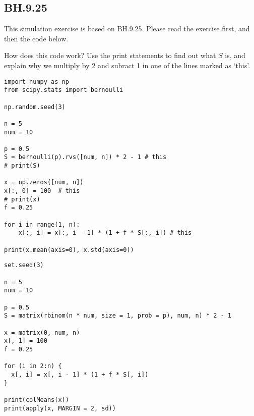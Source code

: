 

\subsection{BH.9.25}

This simulation exercise is based on BH.9.25.  Please read the exercise first, and then the code below.

\begin{exercise}
How does this code work? Use the print statements to find out what $S$ is, and explain why we multiply by 2 and subract 1 in one of the lines marked as `this'.

\begin{verbatim}
import numpy as np
from scipy.stats import bernoulli

np.random.seed(3)

n = 5
num = 10

p = 0.5
S = bernoulli(p).rvs([num, n]) * 2 - 1 # this
# print(S)

x = np.zeros([num, n])
x[:, 0] = 100  # this
# print(x)
f = 0.25

for i in range(1, n):
    x[:, i] = x[:, i - 1] * (1 + f * S[:, i]) # this

print(x.mean(axis=0), x.std(axis=0))
\end{verbatim}

\begin{verbatim}
set.seed(3)

n = 5
num = 10

p = 0.5
S = matrix(rbinom(n * num, size = 1, prob = p), num, n) * 2 - 1

x = matrix(0, num, n)
x[, 1] = 100
f = 0.25

for (i in 2:n) {
  x[, i] = x[, i - 1] * (1 + f * S[, i])
}

print(colMeans(x))
print(apply(x, MARGIN = 2, sd))
\end{verbatim}
\end{exercise}



